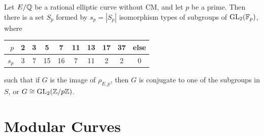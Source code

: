 \begin{conj}
Let $E/\mathbb{Q}$ be a rational elliptic curve without CM, and let $p$ be a prime. Then there is a set $S_p$ formed by $s_p= |S_p|$ isomorphism types of subgroups of $\operatorname{GL}_2(\mathbb{F}_p)$, where
	\begin{table}[!ht]
	\centering
	\begin{tabular}{r|ccccccccc}
	$p$ & 2 & 3 & 5 & 7 & 11 & 13 & 17 & 37 & else \\ \hline
	$s_p$ & 3 & 7 & 15 & 16 & 7 & 11 & 2 & 2 & 0
	\end{tabular}
	\end{table}
such that if $G$ is the image of $\rho_{E,p}$, then $G$ is conjugate to one of the subgroups in $S$, or $G \cong \operatorname{GL}_2(\mathbb{Z}/p\mathbb{Z})$. 
\end{conj}





\section{Modular Curves\label{sec:modcurve}}


